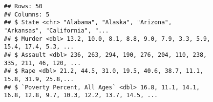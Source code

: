 \documentclass[]{article}
\newenvironment{Shaded}{\begin{snugshade}}{\end{snugshade}}
\newcommand{\CommentTok}[1]{\textcolor[rgb]{0.56,0.35,0.01}{\textit{#1}}}
\newcommand{\DataTypeTok}[1]{\textcolor[rgb]{0.13,0.29,0.53}{#1}}
\newcommand{\KeywordTok}[1]{\textcolor[rgb]{0.13,0.29,0.53}{\textbf{#1}}}
\newcommand{\NormalTok}[1]{#1}
\newcommand{\OperatorTok}[1]{\textcolor[rgb]{0.81,0.36,0.00}{\textbf{#1}}}
\newcommand{\StringTok}[1]{\textcolor[rgb]{0.31,0.60,0.02}{#1}}
\begin{document}
\begin{Shaded}
\end{Shaded}

\begin{verbatim}
## Rows: 50
## Columns: 5
## $ State <chr> "Alabama", "Alaska", "Arizona",
"Arkansas", "California", "...
## $ Murder <dbl> 13.2, 10.0, 8.1, 8.8, 9.0, 7.9, 3.3, 5.9,
15.4, 17.4, 5.3, ...
## $ Assault <dbl> 236, 263, 294, 190, 276, 204, 110, 238,
335, 211, 46, 120, ...
## $ Rape <dbl> 21.2, 44.5, 31.0, 19.5, 40.6, 38.7, 11.1,
15.8, 31.9, 25.8,...
## $ `Poverty Percent, All Ages` <dbl> 16.8, 11.1, 14.1,
16.8, 12.8, 9.7, 10.3, 12.2, 13.7, 14.5, ...
\end{verbatim}
\end{document}
